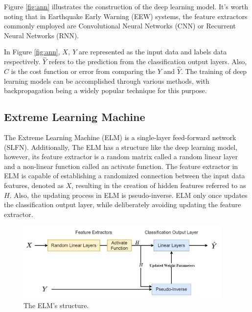 Figure \ref{fig:ann} illustrates the construction of the deep learning model. It's worth noting that in Earthquake Early Warning (EEW) systems, the feature extractors commonly employed are Convolutional Neural Networks (CNN) or Recurrent Neural Networks (RNN). 

In Figure \ref{fig:ann}, $X,\ Y$ are represented as the input data and labels data respectively. $\hat Y$ refers to the prediction from the classification output layers. Also, $C$ is the cost function or error from comparing the $Y$ and $\hat Y$. The training of deep learning models can be accomplished through various methods, with backpropagation being a widely popular technique for this purpose.

\subsection{Extreme Learning Machine}\label{subsec:elm}
The Extreme Learning Machine (ELM) is a single-layer feed-forward network (SLFN). Additionally, The ELM has a structure like the deep learning model, however, its feature extractor is a random matrix called a random linear layer and a non-linear function called an activate function. The feature extractor in ELM is capable of establishing a randomized connection between the input data features, denoted as $X$, resulting in the creation of hidden features referred to as $H$. Also, the updating process in ELM is pseudo-inverse. ELM only once updates the classification output layer, while deliberately avoiding updating the feature extractor. 

\begin{figure}[ht]
    \centering
    \includegraphics[width=0.95\textwidth]{img/ELM.png}
    \caption{The ELM's structure.}
    \label{fig:ELM-model}
\end{figure}

